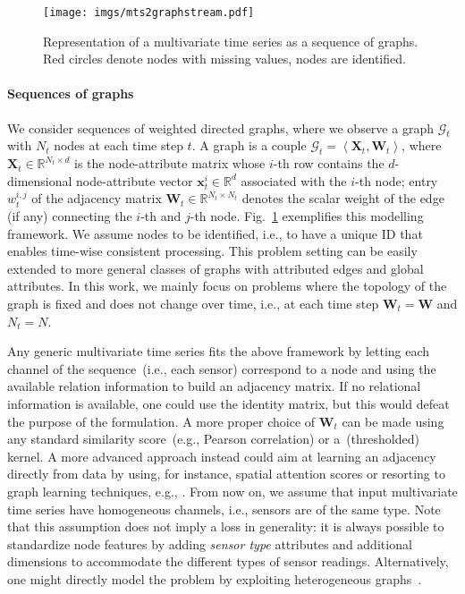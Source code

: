 \documentclass{article} \usepackage{iclr2022_conference,times}
\def\vx{{\bm{x}}}
\def\mW{{\bm{W}}}
\def\mX{{\bm{X}}}
\def\gG{{\mathcal{G}}}
\def\sR{{\mathbb{R}}}
\newcommand{\tuple}[1]{{\left\langle #1 \right\rangle}}
\begin{document}
\begin{figure}
    \centering
    \texttt{[image: imgs/mts2graphstream.pdf]}
    \vspace{-0.6cm}
    \caption{Representation of a multivariate time series as a sequence of graphs. Red circles denote nodes with missing values, nodes are identified.}
    \label{fig:graph_stream}
\end{figure}

\paragraph{Sequences of graphs} We consider sequences of weighted directed graphs, where we observe a graph $\gG_t$ with $N_t$ nodes at each time step $t$. A graph is a couple $\gG_t = \tuple{\mX_t, \mW_t}$, where $\mX_t \in \sR^{N_t \times d}$ is the node-attribute matrix whose $i$-th row contains the $d$-dimensional node-attribute vector $\vx_t^i \in \sR^d$ associated with the $i$-th node; entry $w^{i,j}_t$ of the adjacency matrix $\mW_t \in \sR^{N_t \times N_t}$ denotes the scalar weight of the edge (if any) connecting the $i$-th and $j$-th node. Fig.~\ref{fig:graph_stream} exemplifies this modelling framework. We assume nodes to be identified, i.e., to have a unique ID that enables time-wise consistent processing. This problem setting can be easily extended to more general classes of graphs with attributed edges and global attributes. In this work, we mainly focus on problems where the topology of the graph is fixed and does not change over time, i.e., at each time step $\mW_t=\mW$ and $N_t=N$. 

Any generic multivariate time series fits the above framework by letting each channel of the sequence~(i.e., each sensor) correspond to a node and using the available relation information to build an adjacency matrix. If no relational information is available, one could use the identity matrix, but this would defeat the purpose of the formulation. A more proper choice of $\mW_t$ can be made using any standard similarity score~(e.g., Pearson correlation) or a~(thresholded) kernel. A more advanced approach instead could aim at learning an adjacency directly from data by using, for instance, spatial attention scores or resorting to graph learning techniques, e.g., \citet{kipf2018neural}. From now on, we assume that input multivariate time series have homogeneous channels, i.e., sensors are of the same type. Note that this assumption does not imply a loss in generality: it is always possible to standardize node features by adding \textit{sensor type} attributes and additional dimensions to accommodate the different types of sensor readings. Alternatively, one might directly model the problem by exploiting heterogeneous graphs~\citep{schlichtkrull2018modeling}.
\end{document}

